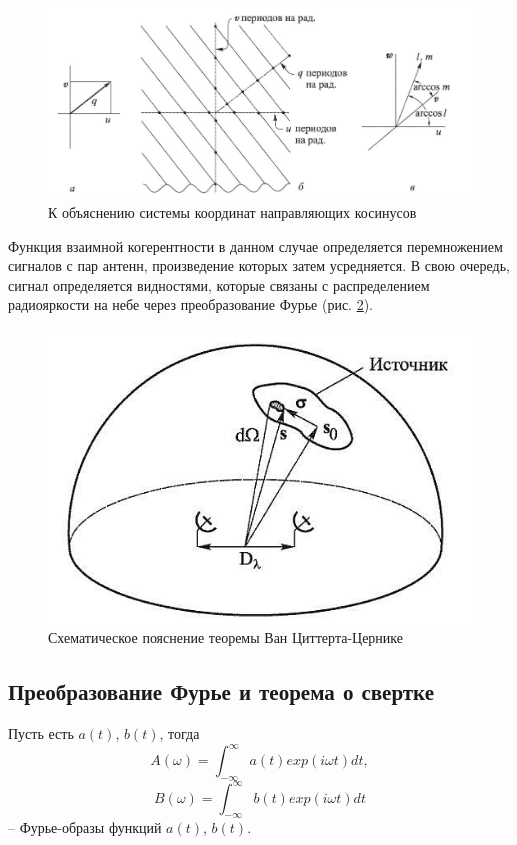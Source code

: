 \begin{figure}[H]
	\centering
	\includegraphics[scale=0.8]{images/cosinuses}
	\caption{К объяснению системы координат направляющих косинусов}
	\label{fig:cosinuses}
\end{figure}

Функция взаимной когерентности в данном случае определяется перемножением сигналов с пар антенн, произведение которых затем усредняется. В свою очередь, сигнал определяется видностями, которые связаны с распределением радиояркости на небе через преобразование Фурье (рис. \ref{fig:Van_Cittert_Zernike}).

\begin{figure}[H]
	\centering
	\includegraphics[scale=1]{images/Van_Cittert_Zernike}
	\caption{Схематическое пояснение теоремы Ван Циттерта-Цернике}
	\label{fig:Van_Cittert_Zernike}
\end{figure}

\subsection{Преобразование Фурье и теорема о свертке}
Пусть есть $a(t)$, $b(t)$, тогда
\begin{equation}\label{eq:Фурье А}
	A(\omega) =\int_{-\infty}^{\infty} a(t)exp(i \omega t) dt,
\end{equation}
\begin{equation}\label{eq:Фурье В}
	B(\omega) =\int_{-\infty}^{\infty} b(t)exp(i \omega t) dt
\end{equation}
-- Фурье-образы функций $a(t)$, $b(t)$.

